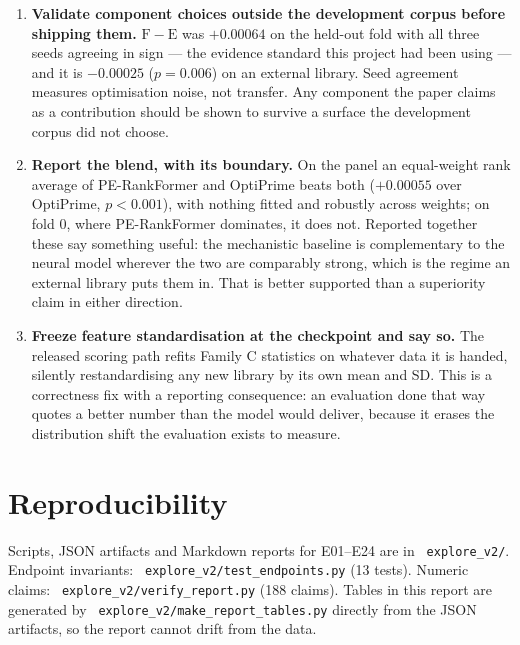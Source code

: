 \documentclass[11pt]{article}
\newcommand{\code}[1]{\texttt{\small\begingroup\hyphenpenalty=10000 #1\endgroup}}
\begin{document}
\begin{enumerate}
\item \textbf{Validate component choices outside the development corpus before shipping
them.} $\mathrm{F}-\mathrm{E}$ was $+0.00064$ on the held-out fold with all three seeds
agreeing in sign --- the evidence standard this project had been using --- and it is
$-0.00025$ ($p = 0.006$) on an external library. Seed agreement measures optimisation noise,
not transfer. Any component the paper claims as a contribution should be shown to survive a
surface the development corpus did not choose.

\item \textbf{Report the blend, with its boundary.} On the panel an equal-weight rank
average of PE-RankFormer and OptiPrime beats both ($+0.00055$ over OptiPrime, $p<0.001$),
with nothing fitted and robustly across weights; on fold 0, where PE-RankFormer dominates, it
does not. Reported together these say something useful: the mechanistic baseline is
complementary to the neural model wherever the two are comparably strong, which is the
regime an external library puts them in. That is better supported than a superiority claim in
either direction.

\item \textbf{Freeze feature standardisation at the checkpoint and say so.} The released
scoring path refits Family C statistics on whatever data it is handed, silently
restandardising any new library by its own mean and SD. This is a correctness fix with a
reporting consequence: an evaluation done that way quotes a better number than the model
would deliver, because it erases the distribution shift the evaluation exists to measure.
\end{enumerate}

\section*{Reproducibility}

Scripts, JSON artifacts and Markdown reports for E01--E24 are in \code{explore\_v2/}. Endpoint
invariants: \code{explore\_v2/test\_endpoints.py} (13 tests). Numeric claims:
\code{explore\_v2/verify\_report.py} (188 claims). Tables in this report are generated by
\code{explore\_v2/make\_report\_tables.py} directly from the JSON artifacts, so the report
cannot drift from the data.
\end{document}
